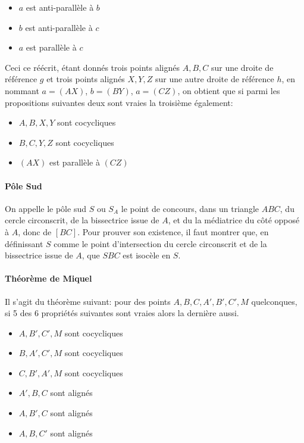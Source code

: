 \begin{itemize}
    \item $a$ est anti-parallèle à $b$
    \item $b$ est anti-parallèle à $c$
    \item $a$ est parallèle à $c$
\end{itemize}

Ceci ce réécrit, étant donnés trois points alignés $A,B,C$ sur une droite de référence $g$ et trois points alignés $X,Y,Z$ sur une autre droite de référence $h$, en nommant $a=(AX)$, $b=(BY)$, $a=(CZ)$, on obtient que si parmi les propositions suivantes deux sont vraies la troisième également:

\begin{itemize}
    \item $A,B,X,Y$ sont cocycliques
    \item $B,C,Y,Z$ sont cocycliques
    \item $(AX)$ est parallèle à $(CZ)$
\end{itemize}


\paragraph{Pôle Sud}

On appelle le pôle sud $S$ ou $S_A$ le point de concours, dans un triangle $ABC$, du cercle circonscrit, de la bissectrice issue de $A$, et du la médiatrice du côté opposé à $A$, donc de $[BC]$. Pour prouver son existence, il faut montrer que, en définissant $S$ comme le point d'intersection du cercle circonscrit et de la bissectrice issue de $A$, que $SBC$ est isocèle en $S$.


\paragraph{Théorème de Miquel}

Il s'agit du théorème suivant: pour des points $A,B,C,A',B',C',M$ quelconques, si 5 des 6 propriétés suivantes sont vraies alors la dernière aussi.

\begin{itemize}
    \item $A,B',C',M$ sont cocycliques
    \item $B,A',C',M$ sont cocycliques
    \item $C,B',A',M$ sont cocycliques
    \item $A',B,C$ sont alignés
    \item $A,B',C$ sont alignés
    \item $A,B,C'$ sont alignés
\end{itemize}

